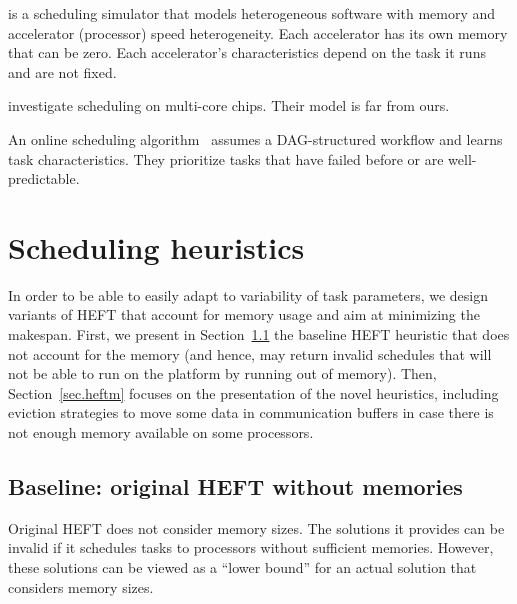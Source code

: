 \documentclass[conference]{IEEEtran}
\newcommand{\skug}[1]{{\color{blue}[SK: #1]}}
\begin{document}
    \cite{lutke2024hetsim} is a scheduling simulator that models heterogeneous software with memory and accelerator
    (processor) speed heterogeneity.
    Each accelerator has its own memory that can be zero.
    Each accelerator's characteristics depend on the task it runs and are not fixed.




    \cite{meng2018traffic} investigate scheduling on multi-core chips.
    Their model is far from ours.


    An online scheduling algorithm~\cite{Witt2018POS} assumes a DAG-structured workflow and learns task characteristics.
    They prioritize tasks that have failed before or are well-predictable.

    \section{Scheduling heuristics} %
\label{sec.heuristics}


In order to be able to easily adapt to variability of task parameters, we design
variants of HEFT that account for memory usage and aim at minimizing the makespan.
First, we present in Section~\ref{sec.heft} the baseline HEFT heuristic that does not account for the memory
(and hence, may return invalid schedules that will not be able to run on the platform
by running out of memory).  Then, Section~\ref{sec.heftm} focuses on the presentation of the novel
heuristics, including eviction strategies to move some data in communication buffers
in case there is not enough memory available on some processors.

    \subsection{Baseline: original HEFT without memories}
\label{sec.heft}

    Original HEFT does not consider memory sizes.
    The solutions it provides can be invalid if it schedules tasks to processors without sufficient memories.
    However, these solutions can be viewed as a ``lower bound'' for an actual solution that considers memory sizes.
\end{document}
